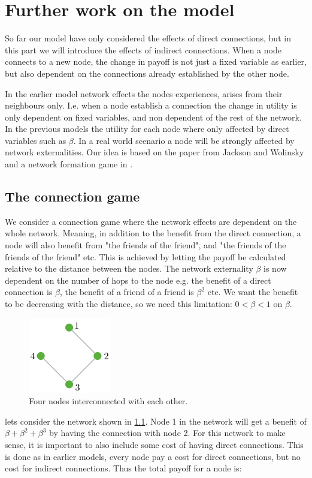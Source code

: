 \chapter{Further work on the model}
\label{secondPhaseOfModelingCyberInsurance} 

So far our model have only considered the effects of direct connections, but in this part we will introduce the effects of indirect connections. When a node connects to a new node, the change in payoff is not just a fixed variable as earlier, but also dependent on the connections already established by the other node.

In the earlier model network effects the nodes experiences, arises from their neighbours only. I.e. when a node establish a connection the change in utility is only dependent on fixed variables, and non dependent of the rest of the network.
In the previous models the utility for each node where only affected by direct variables such as $\beta$. In a real world scenario a node will be strongly affected by network externalities. Our idea is based on the paper from Jackson and Wolinsky \cite{jackson1996strategic} and a network formation game in \cite{jackson2005survey}. 

\section{The connection game}
We consider a connection game where the network effects are dependent on the whole network.  Meaning, in addition to the benefit from the direct connection, a node will also benefit from "the friends of the friend", and "the friends of the friends of the friend" etc. This is achieved by letting the payoff be calculated relative to the distance between the nodes. The network externality $\beta$ is now dependent on the number of hops to the node e.g. the benefit of a direct connection is $\beta$, the benefit of a friend of a friend is $\beta^2$ etc. We want the benefit to be decreasing with the distance, so we need this limitation: $0<\beta<1$ on $\beta$. 

\begin{figure}[h]
\centering
  \includegraphics[width=0.2\linewidth]{../Figures/connectionGame.png}
  \caption{\label{fig:connectionGame} Four nodes interconnected with each other.}
\end{figure}
lets consider the network shown in \ref{fig:connectionGame}. Node 1 in the network will get a benefit of $\beta+\beta^{2}+\beta^{3}$ by having the connection with node 2. For this network to make sense, it is important to also include some cost of having direct connections. This is done as in earlier models, every node pay a cost for direct connections, but no cost for indirect connections. Thus the total payoff for a node is:

